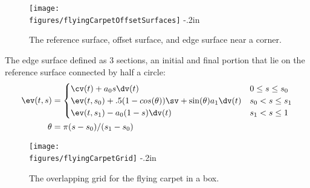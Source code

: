 \begin{figure}[h]
  \begin{center}
  \texttt{[image: \\figures/flyingCarpetOffsetSurfaces]} 
   \vglue-.2in
  \caption{ The reference surface, offset surface, and edge surface near a corner.} 
  \end{center} 
\end{figure}

The edge surface defined as 3 sections, an initial and final portion that lie on the reference
surface connected by half a circle:
\begin{align*}
  \ev(t,s) &= 
     \begin{cases}
      \cv(t) + a_0 s \dv(t) &  0\le s \le s_0 \\
       \ev(t,s_0) + .5 (1-cos(\theta)) \sv + \sin(\theta) a_1 \dv(t) &  s_0 < s \le s_1\\
      \ev(t,s_1) - a_0 (1-s) \dv(t) & s_1 < s \le 1 \\
     \end{cases}  \\
  \theta & = \pi (s-s_0)/(s_1-s_0)
\end{align*}


\begin{figure}[h]
  \begin{center}
   \texttt{[image: \\figures/flyingCarpetGrid]} 
   \vglue-.2in
  \caption{The overlapping grid for the flying carpet in a box.}
  \end{center}
\end{figure}

